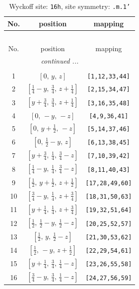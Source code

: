 \documentclass[fleqn,8pt]{jsarticle}
\begin{document}
\renewcommand{\arraystretch}{1.2}
\begin{longtable}{ccc}
\caption{Wyckoff site: {\tt 16h}, site symmetry: {\tt .m.1'}}
 \\
 \hline \hline
No. & position & mapping \\ \hline \endfirsthead

\multicolumn{2}{l}{\tablename\ \thetable{}} \\
 \hline \hline
No. & position & mapping \\ \hline \endhead

 \hline \hline
\multicolumn{2}{r}{\footnotesize\it continued ...} \\ \endfoot

 \hline \hline
\multicolumn{2}{r}{} \\ \endlastfoot

1 & $\left[ 0,\, y,\, z \right]$ & {\tt [1,12,33,44]} \\ \hline
2 & $\left[ \frac{1}{4} - y,\, \frac{3}{4},\, z + \frac{1}{4} \right]$ & {\tt [2,15,34,47]} \\ \hline
3 & $\left[ y + \frac{3}{4},\, \frac{3}{4},\, z + \frac{1}{4} \right]$ & {\tt [3,16,35,48]} \\ \hline
4 & $\left[ 0,\, - y,\, - z \right]$ & {\tt [4,9,36,41]} \\ \hline
5 & $\left[ 0,\, y + \frac{1}{2},\, - z \right]$ & {\tt [5,14,37,46]} \\ \hline
6 & $\left[ 0,\, \frac{1}{2} - y,\, z \right]$ & {\tt [6,13,38,45]} \\ \hline
7 & $\left[ y + \frac{3}{4},\, \frac{1}{4},\, \frac{3}{4} - z \right]$ & {\tt [7,10,39,42]} \\ \hline
8 & $\left[ \frac{1}{4} - y,\, \frac{1}{4},\, \frac{3}{4} - z \right]$ & {\tt [8,11,40,43]} \\ \hline
9 & $\left[ \frac{1}{2},\, y + \frac{1}{2},\, z + \frac{1}{2} \right]$ & {\tt [17,28,49,60]} \\ \hline
10 & $\left[ \frac{3}{4} - y,\, \frac{1}{4},\, z + \frac{3}{4} \right]$ & {\tt [18,31,50,63]} \\ \hline
11 & $\left[ y + \frac{1}{4},\, \frac{1}{4},\, z + \frac{3}{4} \right]$ & {\tt [19,32,51,64]} \\ \hline
12 & $\left[ \frac{1}{2},\, \frac{1}{2} - y,\, \frac{1}{2} - z \right]$ & {\tt [20,25,52,57]} \\ \hline
13 & $\left[ \frac{1}{2},\, y,\, \frac{1}{2} - z \right]$ & {\tt [21,30,53,62]} \\ \hline
14 & $\left[ \frac{1}{2},\, - y,\, z + \frac{1}{2} \right]$ & {\tt [22,29,54,61]} \\ \hline
15 & $\left[ y + \frac{1}{4},\, \frac{3}{4},\, \frac{1}{4} - z \right]$ & {\tt [23,26,55,58]} \\ \hline
16 & $\left[ \frac{3}{4} - y,\, \frac{3}{4},\, \frac{1}{4} - z \right]$ & {\tt [24,27,56,59]} \\
\end{longtable}
\end{document}
